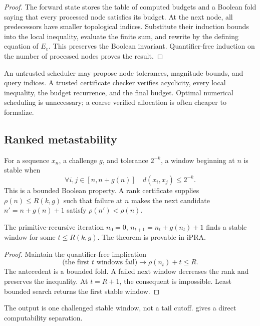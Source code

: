 \begin{proof}
The forward state stores the table of computed budgets and a Boolean fold saying that every processed node satisfies its budget.  At the next node, all predecessors have smaller topological indices.  Substitute their induction bounds into the local inequality, evaluate the finite sum, and rewrite by the defining equation of \(E_v\).  This preserves the Boolean invariant.  Quantifier-free induction on the number of processed nodes proves the result.
\end{proof}

An untrusted scheduler may propose node tolerances, magnitude bounds, and query indices.  A trusted certificate checker verifies acyclicity, every local inequality, the budget recurrence, and the final budget.  Optimal numerical scheduling is unnecessary; a coarse verified allocation is often cheaper to formalize.

\subsection{Ranked metastability}

For a sequence \(x_n\), a challenge \(g\), and tolerance \(2^{-k}\), a window beginning at \(n\) is stable when
\[
  \forall i,j\in[n,n+g(n)]\quad d(x_i,x_j)\leq 2^{-k}.
\]
This is a bounded Boolean property.  A rank certificate supplies \(\rho(n)\leq R(k,g)\) such that failure at \(n\) makes the next candidate \(n'=n+g(n)+1\) satisfy \(\rho(n')<\rho(n)\).

\begin{theorem}
The primitive-recursive iteration \(n_0=0\), \(n_{t+1}=n_t+g(n_t)+1\) finds a stable window for some \(t\leq R(k,g)\).  The theorem is provable in iPRA.
\end{theorem}

\begin{proof}
Maintain the quantifier-free implication
\[
  \bigl(\text{the first }t\text{ windows fail}\bigr)
  \longrightarrow \rho(n_t)+t\leq R.
\]
The antecedent is a bounded fold.  A failed next window decreases the rank and preserves the inequality.  At \(t=R+1\), the consequent is impossible.  Least bounded search returns the first stable window.
\end{proof}

The output is one challenged stable window, not a tail cutoff.   gives a direct computability separation.
